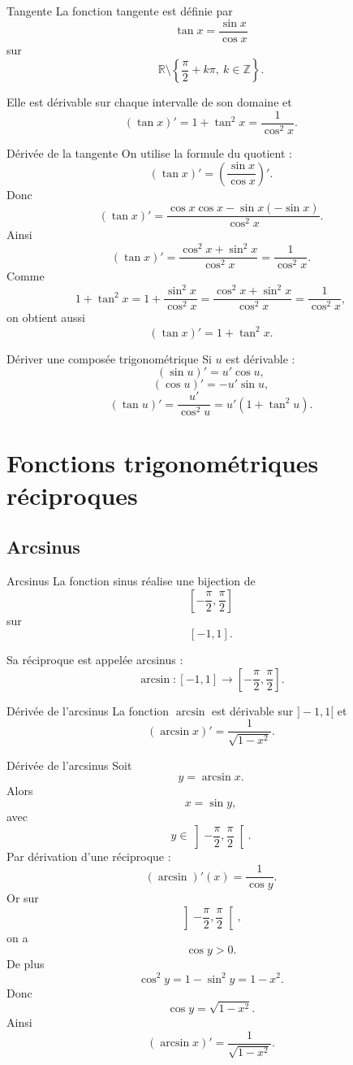 \documentclass[11pt,a4paper]{article}
\newcommand{\R}{\mathbb{R}}
\begin{document}
\begin{theorembox}{Tangente}
La fonction tangente est définie par
\[
\tan x=\frac{\sin x}{\cos x}
\]
sur
\[
\R\setminus\left\{\frac\pi2+k\pi,\ k\in\mathbb{Z}\right\}.
\]

Elle est dérivable sur chaque intervalle de son domaine et
\[
(\tan x)'=1+\tan^2 x=\frac1{\cos^2 x}.
\]
\end{theorembox}

\begin{proofbox}{Dérivée de la tangente}
On utilise la formule du quotient :
\[
(\tan x)'=
\left(\frac{\sin x}{\cos x}\right)'.
\]
Donc
\[
(\tan x)'
=
\frac{\cos x\cos x-\sin x(-\sin x)}{\cos^2 x}.
\]
Ainsi
\[
(\tan x)'=
\frac{\cos^2 x+\sin^2 x}{\cos^2 x}
=
\frac1{\cos^2 x}.
\]
Comme
\[
1+\tan^2 x
=
1+\frac{\sin^2 x}{\cos^2 x}
=
\frac{\cos^2 x+\sin^2 x}{\cos^2 x}
=
\frac1{\cos^2 x},
\]
on obtient aussi
\[
(\tan x)'=1+\tan^2 x.
\]
\end{proofbox}

\begin{methodbox}{Dériver une composée trigonométrique}
Si $u$ est dérivable :
\[
(\sin u)'=u'\cos u,
\]
\[
(\cos u)'=-u'\sin u,
\]
\[
(\tan u)'=\frac{u'}{\cos^2 u}=u'(1+\tan^2 u).
\]
\end{methodbox}

\section{Fonctions trigonométriques réciproques}

\subsection{Arcsinus}

\begin{definitionbox}{Arcsinus}
La fonction sinus réalise une bijection de
\[
\left[-\frac\pi2,\frac\pi2\right]
\]
sur
\[
[-1,1].
\]

Sa réciproque est appelée arcsinus :
\[
\arcsin : [-1,1]\to\left[-\frac\pi2,\frac\pi2\right].
\]
\end{definitionbox}

\begin{theorembox}{Dérivée de l'arcsinus}
La fonction $\arcsin$ est dérivable sur $]-1,1[$ et
\[
(\arcsin x)'=\frac1{\sqrt{1-x^2}}.
\]
\end{theorembox}

\begin{proofbox}{Dérivée de l'arcsinus}
Soit
\[
y=\arcsin x.
\]
Alors
\[
x=\sin y,
\]
avec
\[
y\in\left]-\frac\pi2,\frac\pi2\right[.
\]
Par dérivation d'une réciproque :
\[
(\arcsin)'(x)=\frac1{\cos y}.
\]
Or sur
\[
\left]-\frac\pi2,\frac\pi2\right[,
\]
on a
\[
\cos y>0.
\]
De plus
\[
\cos^2 y=1-\sin^2 y=1-x^2.
\]
Donc
\[
\cos y=\sqrt{1-x^2}.
\]
Ainsi
\[
(\arcsin x)'=\frac1{\sqrt{1-x^2}}.
\]
\end{proofbox}
\end{document}
